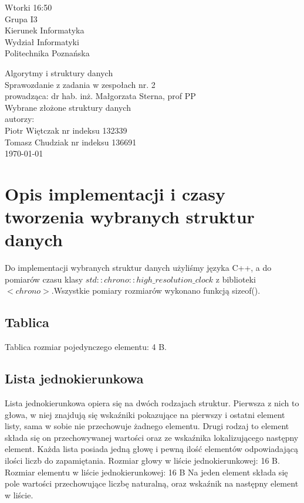 \documentclass[polish,polish,a4paper]{article}
\begin{document}
	
		\begin{titlepage}
			\begin{flushright}
				{ Wtorki 16:50\\
					Grupa I3\\
					Kierunek Informatyka\\
					Wydział Informatyki\\
					Politechnika Poznańska}
			\end{flushright}
		\vspace*{\fill}
		\begin{center}
			{\Large Algorytmy i struktury danych \\[0.1cm]
				Sprawozdanie z zadania w zespołach nr. 2\\[0.1cm]
				prowadząca: dr hab. inż. Małgorzata Sterna, prof PP}\\
			{\Huge Wybrane złożone struktury danych\\ [0.4cm]}
			{\large autorzy:\\[0.1cm]}
			{\large Piotr Więtczak nr indeksu 132339\\[0.1cm] Tomasz Chudziak nr indeksu 136691}\\[0.5cm]
			\today
		\end{center}
		\vspace*{\fill}
	\end{titlepage}

\section{Opis implementacji i czasy tworzenia wybranych struktur danych}

	
Do implementacji wybranych struktur danych użyliśmy języka C++, a do pomiarów czasu klasy $ std::chrono::high\_resolution\_clock $  z biblioteki $<chrono>$.Wszystkie pomiary rozmiarów wykonano funkcją sizeof().


\subsection*{Tablica}

Tablica rozmiar pojedynczego elementu:
4 B.

\subsection*{Lista jednokierunkowa}

Lista jednokierunkowa opiera się na dwóch rodzajach struktur. Pierwsza z nich to głowa, w niej znajdują się wskaźniki pokazujące na pierwszy i ostatni element listy, sama w sobie nie przechowuje żadnego elementu. Drugi rodzaj to element składa się on przechowywanej wartości oraz ze wskaźnika lokalizującego następny element. Każda lista posiada jedną głowę i pewną ilość elementów odpowiadającą ilości liczb do zapamiętania.
Rozmiar głowy w liście jednokierunkowej:
16 B.
Rozmiar elementu w liście jednokierunkowej:
16 B
Na jeden element składa się pole wartości przechowujące liczbę naturalną, oraz wskaźnik na następny element w liście.
\end{document}
